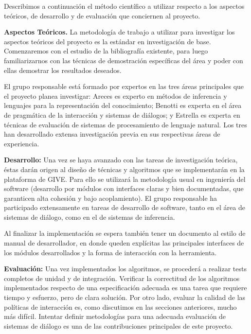 
Describimos a continuaci\'on el m\'etodo cient\'ifico a utilizar
respecto a los aspectos te\'oricos, de desarrollo y de evaluaci\'on
que conciernen al proyecto.

\begin{myitemize}
\item \textbf{Aspectos Te\'oricos.}
La metodolog\'ia de trabajo a utilizar para investigar los aspectos
te\'oricos del proyecto es la est\'andar en investigaci\'on de base.
Comenzaremos con el estudio de la bibliograf\'ia existente, para luego
familiarizarnos con las t\'ecnicas de demostraci\'on espec\'ificas del
\'area y poder con ellas demostrar los resultados deseados.

El grupo
responsable est\'a formado por expertos en las tres \'areas principales
que el proyecto planea investigar: Areces es
experto en m\'etodos de inferencia y lenguajes para la representaci\'on del
conocimiento; Benotti es experta en el \'area de
pragm\'atica de la interacci\'on y sistemas de di\'alogos; y Estrella es experta en t\'ecnicas
de evaluaci\'on de sistemas de procesamiento de lenguaje natural.
Los tres han desarrollado extensa investigaci\'on previa en sus respectivas
\'areas
de experiencia.

\item \textbf{Desarrollo:}
Una vez se haya avanzado con las tareas de investigaci\'on te\'orica,
\'estas dar\'an origen al dise\~no de t\'ecnicas y algoritmos que se
implementar\'an en la plataforma de GIVE. Para ello se utilizar\'a la
metodolog\'ia
usual en ingenier\'ia del software (desarrollo por
m\'odulos con interfaces claras y bien documentadas,
que garanticen alta cohesi\'on y bajo acoplamiento).  El grupo
responsable ha participado extensamente en tareas de desarrollo de
software, tanto en el \'area de sistemas de di\'alogo, como en el
de sistemas de inferencia.

Al finalizar la implementaci\'on
se espera tambi\'en tener un documento al estilo de manual de
desarrollador, en donde queden expl\'icitas las principales interfaces
de los m\'odulos desarrollados y la forma de interacci\'on con la
herramienta.


\item \textbf{Evaluaci\'on:}
Una vez implementados los algoritmos, se proceder\'a a realizar tests
completos de unidad y de integraci\'on.  Verificar la correctitud de los
algoritmos implementados respecto de una especificaci\'on adecuada es una
tarea que requiere tiempo y esfuerzo, pero de clara soluci\'on.  
Por otro lado, evaluar la calidad de las pol\'iticas de interacci\'on es, como
discutimos en las secciones anteriores, mucho m\'as dif\'icil.  Intentar
definir metodolog\'ias para una adecuada evaluaci\'on de sistemas de
di\'alogo es una de las contribuciones principales de este proyecto.


\end{myitemize}
